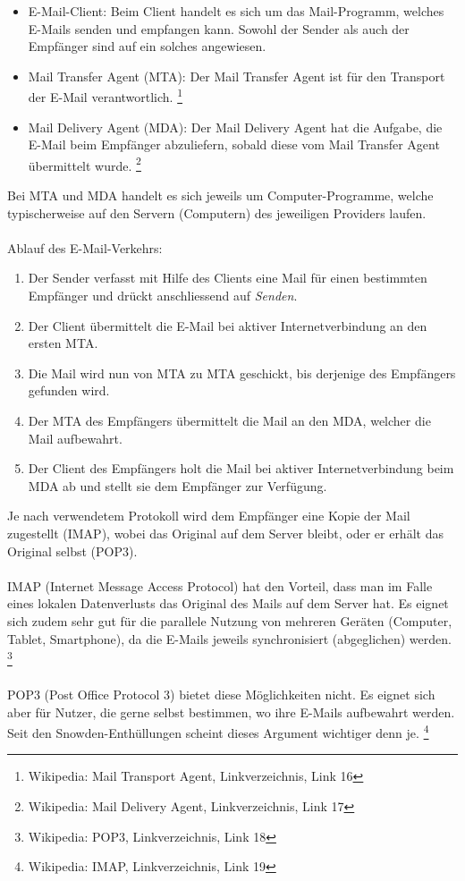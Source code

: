 \begin{itemize}
\item E-Mail-Client: Beim Client handelt es sich um das Mail-Programm, welches E-Mails senden und empfangen kann. Sowohl der Sender als auch der Empfänger sind auf ein solches angewiesen.
\item Mail Transfer Agent (MTA): Der Mail Transfer Agent ist für den Transport der E-Mail verantwortlich.
\footnote{Wikipedia: Mail Transport Agent, Linkverzeichnis, Link 16}
\item Mail Delivery Agent (MDA): Der Mail Delivery Agent hat die Aufgabe, die E-Mail beim Empfänger abzuliefern, sobald diese vom Mail Transfer Agent übermittelt wurde.
\footnote{Wikipedia: Mail Delivery Agent, Linkverzeichnis, Link 17}
\end{itemize}

Bei MTA und MDA handelt es sich jeweils um Computer-Programme, welche typischerweise auf den Servern (Computern) des jeweiligen Providers laufen.
\\
\\
Ablauf des E-Mail-Verkehrs:

\begin{enumerate}
\item Der Sender verfasst mit Hilfe des Clients eine Mail für einen bestimmten Empfänger und drückt anschliessend auf \textit{Senden}.
\item Der Client übermittelt die E-Mail bei aktiver Internetverbindung an den ersten MTA.
\item Die Mail wird nun von MTA zu MTA geschickt, bis derjenige des Empfängers gefunden wird.
\item Der MTA des Empfängers übermittelt die Mail an den MDA, welcher die Mail aufbewahrt.
\item Der Client des Empfängers holt die Mail bei aktiver Internetverbindung beim MDA ab und stellt sie dem Empfänger zur Verfügung.
\end{enumerate}

Je nach verwendetem Protokoll wird dem Empfänger eine Kopie der Mail zugestellt (IMAP), wobei das Original auf dem Server bleibt, oder er erhält das Original selbst (POP3).
\\
\\
IMAP (Internet Message Access Protocol) hat den Vorteil, dass man im Falle eines lokalen Datenverlusts das Original des Mails auf dem Server hat. Es eignet sich zudem sehr gut für die parallele Nutzung von mehreren Geräten (Computer, Tablet, Smartphone), da die E-Mails jeweils synchronisiert (abgeglichen) werden.
\footnote{Wikipedia: POP3, Linkverzeichnis, Link 18}
\\
\\
POP3 (Post Office Protocol 3) bietet diese Möglichkeiten nicht. Es eignet sich aber für Nutzer, die gerne selbst bestimmen, wo ihre E-Mails aufbewahrt werden. Seit den Snowden-Enthüllungen scheint dieses Argument wichtiger denn je.
\footnote{Wikipedia: IMAP, Linkverzeichnis, Link 19}

